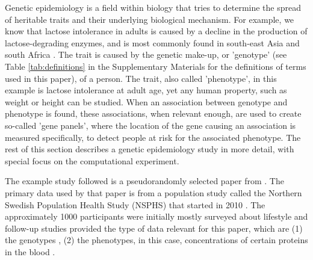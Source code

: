 Genetic epidemiology is a field within biology that
tries to determine the spread of heritable traits 
and their underlying biological mechanism.
For example, we know that lactose intolerance in adults is
caused by a decline in the production of lactose-degrading enzymes,
and is most commonly found in south-east Asia and south Africa \cite{storhaug2017country}.
The trait is caused by the genetic make-up, or 'genotype'
(see Table \ref{tab:definitions} in the Supplementary Materials
for the definitions of terms used in this paper), of a person.
The trait, also called 'phenotype', 
in this example is lactose intolerance at adult age,
yet any human property, such as weight or height can be studied.
When an association between genotype and phenotype is found,
these associations, when relevant enough, are used to 
create so-called 'gene panels', 
where the location of the gene causing 
an association is measured specifically, 
to detect people at risk for the associated phenotype.
The rest of this section describes a genetic epidemiology study 
in more detail, with special focus on the computational experiment.

The example study followed is a pseudorandomly selected paper
from \cite{ahsan2017relative}. The primary data used by that paper is
from a population study called the Northern Swedish Population
Health Study (NSPHS) that started in 2010 \cite{igl2010northern}. 
The approximately 1000 participants were initially mostly surveyed
about lifestyle \cite{igl2010northern} and follow-up studies
provided the type of data relevant for this paper, 
which are (1) the genotypes \cite{johansson2013identification},
(2) the phenotypes, in this case, concentrations of certain proteins in the 
blood \cite{enroth2014strong,enroth2015effect}.

